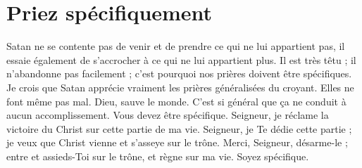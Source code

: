 \section*{Priez spécifiquement}

Satan ne se contente pas de venir et de prendre ce qui ne lui appartient pas,
 il essaie également de s'accrocher à ce qui ne lui appartient plus.
 Il est très têtu ; il n'abandonne pas facilement ;
 c'est pourquoi nos prières doivent être spécifiques.
 Je crois que Satan apprécie vraiment les prières généralisées du croyant.
 Elles ne font même pas mal. \og Dieu, sauve le monde. \fg{}
 C'est si général que ça ne conduit à aucun accomplissement.
 Vous devez être spécifique. \og Seigneur, je réclame la victoire du Christ
 sur cette partie de ma vie. Seigneur, je Te dédie cette partie ;
 je veux que Christ vienne et s'asseye sur le trône.
 Merci, Seigneur, désarme-le ; entre et assieds-Toi sur le trône,
 et règne sur ma vie. \fg{} Soyez spécifique.


\closechapter

